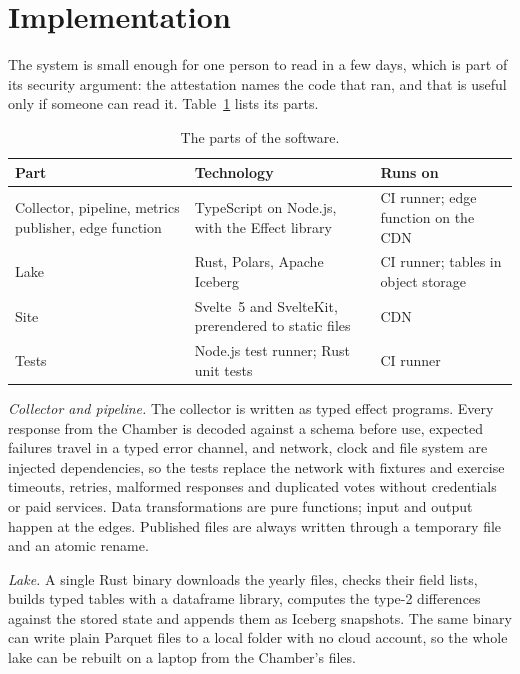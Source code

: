 \section{Implementation}
\label{sec:impl}

The system is small enough for one person to read in a few days, which is part of its security argument: the attestation names the code that ran, and that is useful only if someone can read it. Table~\ref{tab:software} lists its parts.

\begin{table}[t]
\centering
\small
\begin{tabularx}{\textwidth}{@{}>{\raggedright\arraybackslash}p{3.6cm}>{\raggedright\arraybackslash}p{5.0cm}>{\raggedright\arraybackslash}X@{}}
\toprule
Part & Technology & Runs on \\
\midrule
Collector, pipeline, metrics publisher, edge function & TypeScript on Node.js, with the Effect library & CI runner; edge function on the CDN \\
\addlinespace[3pt]
Lake & Rust, Polars, Apache Iceberg & CI runner; tables in object storage \\
\addlinespace[3pt]
Site & Svelte~5 and SvelteKit, prerendered to static files & CDN \\
\addlinespace[3pt]
Tests & Node.js test runner; Rust unit tests & CI runner \\
\bottomrule
\end{tabularx}
\caption{The parts of the software.}
\label{tab:software}
\end{table}

\emph{Collector and pipeline.} The collector is written as typed effect programs. Every response from the Chamber is decoded against a schema before use, expected failures travel in a typed error channel, and network, clock and file system are injected dependencies, so the tests replace the network with fixtures and exercise timeouts, retries, malformed responses and duplicated votes without credentials or paid services. Data transformations are pure functions; input and output happen at the edges. Published files are always written through a temporary file and an atomic rename.

\emph{Lake.} A single Rust binary downloads the yearly files, checks their field lists, builds typed tables with a dataframe library, computes the type-2 differences against the stored state and appends them as Iceberg snapshots. The same binary can write plain Parquet files to a local folder with no cloud account, so the whole lake can be rebuilt on a laptop from the Chamber's files.

